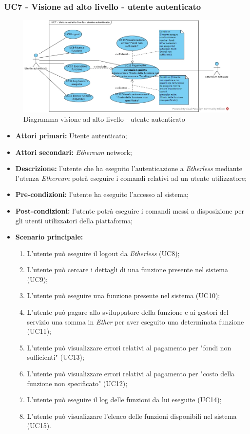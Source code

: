 \subsubsection{UC7 - Visione ad alto livello - utente autenticato}
\begin{figure}[h]
	\centering
	\includegraphics[width=\linewidth]{res/img/UC7.jpg}
	\caption{Diagramma visione ad alto livello - utente autenticato}
\end{figure}
\begin{itemize}
	\item \textbf{Attori primari:} Utente autenticato;
	\item \textbf{Attori secondari:} \textit{Ethereum\glo} network;
	\item \textbf{Descrizione:} l'utente che ha eseguito l'autenticazione a \textit{Etherless} mediante l'utenza \textit{Ethereum\glo} potrà eseguire i comandi relativi ad un utente utilizzatore;
	\item \textbf{Pre-condizioni:} l'utente ha eseguito l'accesso al sistema;
	\item \textbf{Post-condizioni:} l'utente potrà eseguire i comandi messi a disposizione per gli utenti utilizzatori della piattaforma;
	\item \textbf{Scenario principale:}
	\begin{enumerate}
		\item L'utente può eseguire il logout da \textit{Etherless} (UC8);
		\item L'utente può cercare i dettagli di una funzione presente nel sistema (UC9);
		\item L'utente può eseguire una funzione presente nel sistema (UC10);
		\item L'utente può pagare allo sviluppatore della funzione e ai gestori del servizio una somma in \textit{Ether\glo} per aver eseguito una determinata funzione (UC11);
		\item L'utente può visualizzare errori relativi al pagamento per "fondi non sufficienti" (UC13);
		\item L'utente può visualizzare errori relativi al pagamento per "costo della funzione non specificato" (UC12);
		\item L'utente può eseguire il log delle funzioni da lui eseguite (UC14);
		\item L'utente può visualizzare l'elenco delle funzioni disponibili nel sistema (UC15).
	\end{enumerate}
\end{itemize}

